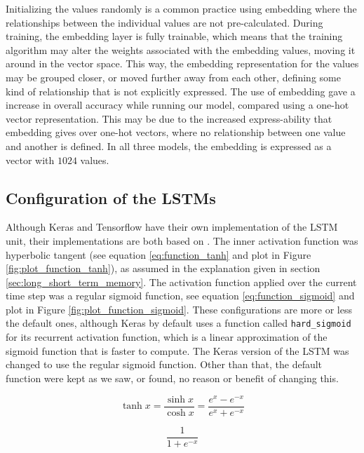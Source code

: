 Initializing the values randomly is a common practice using embedding where the relationships between the individual values are not pre-calculated. During training, the embedding layer is fully trainable, which means that the training algorithm may alter the weights associated with the embedding values, moving it around in the vector space. This way, the embedding representation for the values may be grouped closer, or moved further away from each other, defining some kind of relationship that is not explicitly expressed. The use of embedding gave a increase in overall accuracy while running our model, compared using a one-hot vector representation. This may be due to the increased express-ability that embedding gives over one-hot vectors, where no relationship between one value and another is defined. In all three models, the embedding is expressed as a vector with \(1024\) values.

\subsection{Configuration of the LSTMs}
Although Keras and Tensorflow have their own implementation of the LSTM unit, their implementations are both based on \citep{hochreiter1997long}. The inner activation function was hyperbolic tangent (see equation \ref{eq:function_tanh} and plot in Figure \ref{fig:plot_function_tanh}), as assumed in the explanation given in section \ref{sec:long_short_term_memory}. The activation function applied over the current time step was a regular sigmoid function, see equation \ref{eq:function_sigmoid} and plot in Figure \ref{fig:plot_function_sigmoid}. These configurations are more or less the default ones, although Keras by default uses a function called {\tt hard\_sigmoid} for its recurrent activation function, which is a linear approximation of the sigmoid function that is faster to compute. The Keras version of the LSTM was changed to use the regular sigmoid function. Other than that, the default function were kept as we saw, or found, no reason or benefit of changing this.

\begin{figure}[ht]
    \centering
    \begin{minipage}{.5\textwidth}
        \centering
        \captionsetup{justification=centering}
        \begin{equation}\label{eq:function_tanh}
            \tanh{x} = \frac{\sinh{x}}{\cosh{x}} = \frac{e^{x}-e^{-x}}{e^{x}+e^{-x}}
        \end{equation}
    \end{minipage}%
    \begin{minipage}{.5\textwidth}
        \centering
        \captionsetup{justification=centering}
        \begin{equation}\label{eq:function_sigmoid}
            \frac{1}{1+e^{-x}}
        \end{equation}
    \end{minipage}%
\end{figure}

